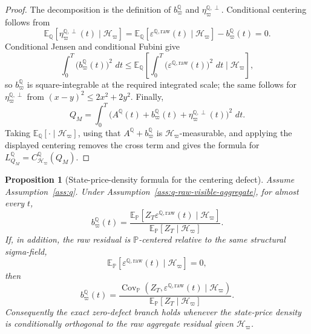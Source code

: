 \documentclass[11pt,a4paper]{amsart}
\theoremstyle{plain}
\newtheorem{proposition}[theorem]{Proposition}
\theoremstyle{definition}
\theoremstyle{remark}
\DeclareMathOperator{\Cov}{Cov}
\newcommand{\PP}{\mathbb{P}}
\newcommand{\QQ}{\mathbb{Q}}
\newcommand{\EE}{\mathbb{E}}
\newcommand{\cH}{\mathcal{H}}
\newcommand{\dd}{\,d}
\begin{document}
\begin{proof}
The decomposition is the definition of \(b_\varpi^\QQ\) and
\(\eta_\varpi^{\QQ,\perp}\).  Conditional centering follows from
\[
        \EE_\QQ[\eta_\varpi^{\QQ,\perp}(t)\mid\cH_\varpi]
        =
        \EE_\QQ[\varepsilon^{\QQ,\mathrm{raw}}(t)\mid\cH_\varpi]
        -
        b_\varpi^\QQ(t)
        =
        0.
\]
Conditional Jensen and conditional Fubini give
\[
        \int_0^T \bigl(b_\varpi^\QQ(t)\bigr)^2\,\dd t
        \le
        \EE_\QQ\!\left[
                \int_0^T \bigl(\varepsilon^{\QQ,\mathrm{raw}}(t)\bigr)^2\,\dd t
                \mid \cH_\varpi
        \right],
\]
so \(b_\varpi^\QQ\) is square-integrable at the required integrated scale; the same follows for
\(\eta_\varpi^{\QQ,\perp}\) from \((x-y)^2\le2x^2+2y^2\).  Finally,
\[
        Q_M
        =
        \int_0^T
        \bigl(A^\QQ(t)+b_\varpi^\QQ(t)+\eta_\varpi^{\QQ,\perp}(t)\bigr)^2\,\dd t.
\]
Taking \(\EE_\QQ[\cdot\mid\cH_\varpi]\), using that \(A^\QQ+b_\varpi^\QQ\) is
\(\cH_\varpi\)-measurable, and applying the displayed centering removes the cross term and gives
the formula for \(L_{Q_M}^\QQ=C_{\cH_\varpi}^\QQ(Q_M)\).
\end{proof}

\begin{proposition}[State-price-density formula for the centering defect]\label{prop:q-centering-density}
Assume Assumption~\ref{ass:q}.  Under Assumption~\ref{ass:q-raw-visible-aggregate}, for almost
every \(t\),
\[
        b_\varpi^\QQ(t)
        =
        \frac{
                \EE_\PP\!\left[
                        Z_T\varepsilon^{\QQ,\mathrm{raw}}(t)
                        \mid \cH_\varpi
                \right]
        }{
                \EE_\PP[Z_T\mid\cH_\varpi]
        }.
\]
If, in addition, the raw residual is \(\PP\)-centered relative to the same structural
sigma-field,
\[
        \EE_\PP[\varepsilon^{\QQ,\mathrm{raw}}(t)\mid\cH_\varpi]=0,
\]
then
\[
        b_\varpi^\QQ(t)
        =
        \frac{
                \Cov_\PP\!\left(
                        Z_T,\varepsilon^{\QQ,\mathrm{raw}}(t)
                        \mid \cH_\varpi
                \right)
        }{
                \EE_\PP[Z_T\mid\cH_\varpi]
        }.
\]
Consequently the exact zero-defect branch holds whenever the state-price density is conditionally
orthogonal to the raw aggregate residual given \(\cH_\varpi\).
\end{proposition}
\end{document}
